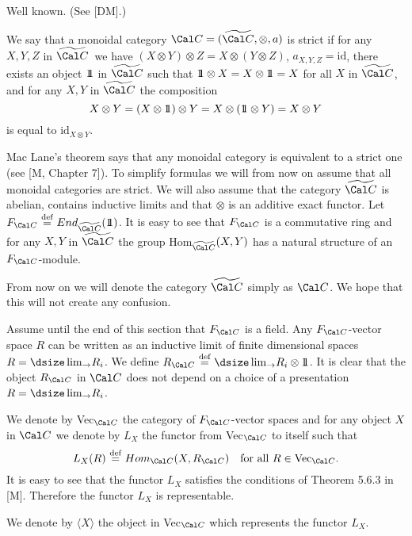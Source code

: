   Well known.  (See [DM].)
\enddemo


  We say that a monoidal category  ${\Cal C}
=
(\widetilde{\Cal C}, \otimes, a)$
is strict if for any $X,Y,Z$  in  $\widetilde{\Cal C}$\ we have
$(X \otimes Y) \otimes Z = X \otimes (Y \otimes Z)$, $a_{X,Y,Z} = \text{id}$,
there exists an object $1\!\!1$ in $\widetilde{\Cal C}$  such that
$1\!\!1 \otimes X = X \otimes 1\!\!1 = X$  for all $X$ in $\widetilde{\Cal C}$,
and for any  $X,Y$ in $\widetilde{\Cal C}$ the composition
$$
X \otimes Y = (X \otimes 1\!\!1) \otimes Y = X \otimes (1\!\!1 \otimes Y) =
X \otimes Y
$$
is equal to $\text{id}_{X\otimes Y}$.
\endproclaim

Mac Lane's theorem says that any monoidal category is equivalent to a strict
one
(see [M, Chapter 7]).   To simplify formulas
we will from now on assume that all monoidal categories are strict.
We will also assume that the category $\widetilde{\Cal C}$
is abelian, contains inductive limits and that $\otimes$  is an additive exact
functor.  Let
$F_{\Cal C}\ {\buildrel {\text{def}}\over =}\ End_{\widetilde{\Cal
C}}(\ident)$.  It
is easy to see that  $F_{\Cal C}$  is a commutative ring and for any
$X,Y$  in $\widetilde{\Cal C}$  the group  Hom$_{\widetilde{\Cal C}}(X,Y)$  has
a natural structure of an $F_{\Cal C}$-module.

{}From now on we will denote the category $\widetilde{\Cal C}$  simply as
${\Cal C}$.  We hope that this will not create any confusion.

  Assume until the end of this section that  $F_{\Cal C}$  is
a field.  Any  $F_{\Cal C}$-vector space $R$ can be written as an inductive
limit of finite dimensional spaces  $R = {\dsize\lim_\rightarrow} R_i$.  We
define
$R_{\Cal C}\ {\buildrel{\text{def}}\over =}\ {\dsize\lim_\rightarrow} R_i
\otimes \ident$.
It is clear that the object $R_{\Cal C}$  in ${\Cal C}$  does not depend on a
choice of a presentation $R = {\dsize\lim_\rightarrow} R_i$.

We denote by Vec$_{\Cal C}$  the category of  $F_{\Cal C}$-vector spaces and
for
any object $X$ in ${\Cal C}$  we denote by $L_X$  the functor from
Vec$_{\Cal C}$ to itself such that
$$
L_X(R)\ {\buildrel{\text{def}}\over =}\ Hom_{\Cal C}(X, R_{\Cal C})\quad
\text{for\ all}\ R \in \text{Vec}_{\Cal C}.
$$
It is easy to see that the functor $L_X$  satisfies the conditions of Theorem
5.6.3 in [M].  Therefore the functor $L_X$  is representable.

  We denote by $\langle X\rangle$ the object in
Vec$_{\Cal C}$  which represents the functor $L_X$.
\endproclaim

